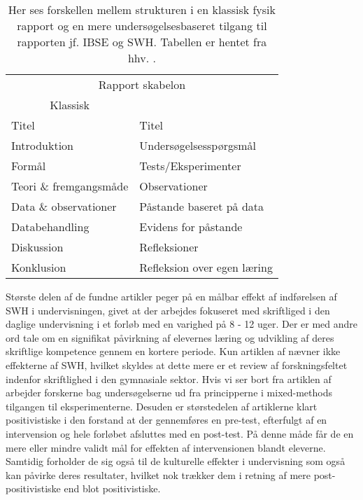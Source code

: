 \begin{table}
	\centering
	\caption{ Her ses forskellen mellem strukturen i en klassisk fysik rapport og en mere undersøgelsesbaseret tilgang til rapporten jf. IBSE og SWH. Tabellen er hentet fra hhv. 
	\citet{Burke2005, Keys1999}.}
	\label{tbl:2.1}
	\begin{tabular}{@{ } l l @{ }}
		\toprule[2.5pt]
			\multicolumn{2}{c}{Rapport skabelon}\\
			\multicolumn{1}{c}{Klassisk} & \multicolumn{1}{c}{\ib{}}\\
		\midrule[1.25pt]
			Titel				&	Titel\\
			Introduktion			&	Undersøgelsesspørgsmål\\
			Formål			& 	Tests/Eksperimenter\\
			Teori \& fremgangsmåde		&	Observationer\\
			Data \& observationer	&	Påstande baseret på data\\
			Databehandling		&	Evidens for påstande\\
			Diskussion			&	Refleksioner\\
			Konklusion			&	Refleksion over egen læring\\
		\bottomrule[2.5pt]
	\end{tabular}
\end{table}

Største delen af de fundne artikler peger på en målbar effekt af indførelsen af SWH i undervisningen, givet at der arbejdes fokuseret med skriftliged i den daglige undervisning i et forløb med en varighed på 8 - 12 uger. Der er med andre ord tale om en signifikat påvirkning af elevernes læring og udvikling af deres skriftlige kompetence gennem en kortere periode. Kun artiklen af \citep{Miller2018} nævner ikke effekterne af SWH, hvilket skyldes at dette mere er et review af forskningsfeltet indenfor skriftlighed i den gymnasiale sektor. Hvis vi ser bort fra artiklen af \citep{Miller2018, Dolin2014, Krogh2016} arbejder forskerne bag undersøgelserne ud fra principperne i mixed-methods tilgangen til eksperimenterne. Desuden er størstedelen af artiklerne klart positivistiske i den forstand at der gennemføres en pre-test, efterfulgt af en intervension og hele forløbet afsluttes med en post-test. På denne måde får de en mere eller mindre validt mål for effekten af intervensionen blandt eleverne. Samtidig forholder de sig også til de kulturelle effekter i undervisning som også kan påvirke deres resultater, hvilket nok trækker dem i retning af mere post-positivistiske end blot positivistiske.


